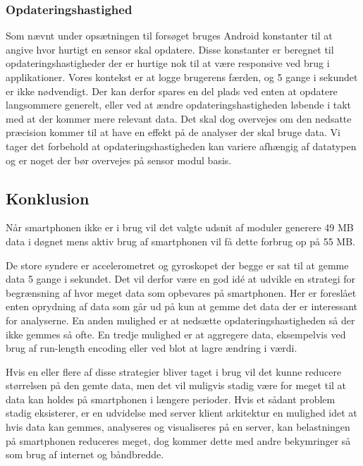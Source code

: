 \subsubsection{Opdateringshastighed}
Som nævnt under opsætningen til forsøget bruges Android konstanter til at angive hvor hurtigt en sensor skal opdatere.
Disse konstanter er beregnet til opdateringshastigheder der er hurtige nok til at være responsive ved brug i applikationer.
Vores kontekst er at logge brugerens færden, og 5 gange i sekundet er ikke nødvendigt.
Der kan derfor spares en del plads ved enten at opdatere langsommere generelt, eller ved at ændre opdateringshastigheden løbende i takt med at der kommer mere relevant data.
Det skal dog overvejes om den nedsatte præcision kommer til at have en effekt på de analyser der skal bruge data.
Vi tager det forbehold at opdateringshastigheden kan variere afhængig af datatypen og er noget der bør overvejes på sensor modul basis.

\subsection{Konklusion}
Når smartphonen ikke er i brug vil det valgte udsnit af moduler generere 49 MB data i døgnet mens aktiv brug af smartphonen vil få dette forbrug op på 55 MB.

De store syndere er accelerometret og gyroskopet der begge er sat til at gemme data 5 gange i sekundet.
Det vil derfor være en god idé at udvikle en strategi for begrænsning af hvor meget data som opbevares på smartphonen.
Her er foreslået enten oprydning af data som går ud på kun at gemme det data der er interessant for analyserne.
En anden mulighed er at nedsætte opdateringshastigheden så der ikke gemmes så ofte.
En tredje mulighed er at aggregere data, eksempelvis ved brug af run-length encoding eller ved blot at lagre ændring i værdi.

Hvis en eller flere af disse strategier bliver taget i brug vil det kunne reducere størrelsen på den gemte data, men det vil muligvis stadig være for meget til at data kan holdes på smartphonen i længere perioder.
Hvis et sådant problem stadig eksisterer, er en udvidelse med server klient arkitektur en mulighed idet at hvis data kan gemmes, analyseres og visualiseres på en server, kan belastningen på smartphonen reduceres meget, dog kommer dette med andre bekymringer så som brug af internet og båndbredde.